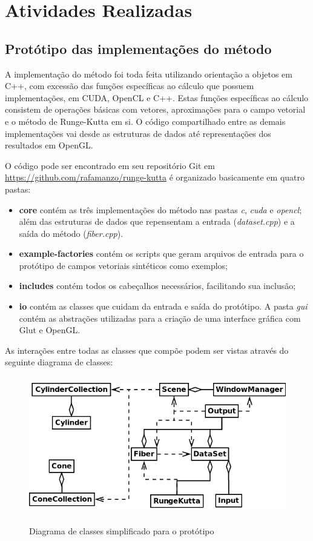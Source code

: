 \chapter{Atividades Realizadas}

\section{Protótipo das implementações do método}
A implementação do método foi toda feita utilizando orientação a objetos em C++, com excessão das funções específicas ao cálculo que possuem implementações, em CUDA, OpenCL e C++. Estas funções específicas ao cálculo consistem de operações básicas com vetores, aproximações para o campo vetorial e o método de Runge-Kutta em si. O código compartilhado entre as demais implementações vai desde as estruturas de dados até representações dos resultados em OpenGL.

O código pode ser encontrado em seu repositório Git em \newline\href{https://github.com/rafamanzo/runge-kutta}{https://github.com/rafamanzo/runge-kutta} é organizado basicamente em quatro pastas:
\begin{itemize}
  \item \textbf{core} contém as três implementações do método nas pastas \textit{c}, \textit{cuda} e \textit{opencl}; além das estruturas de dados que repensentam a entrada (\textit{dataset.cpp}) e a saída do método (\textit{fiber.cpp}).
  \item \textbf{example-factories} contém os scripts que geram arquivos de entrada para o protótipo de campos vetoriais sintéticos como exemplos;
  \item \textbf{includes} contém todos os cabeçalhos necessários, facilitando sua inclusão;
  \item \textbf{io} contém as classes que cuidam da entrada e saída do protótipo. A pasta \textit{gui} contém as abstrações utilizadas para a criação de uma interface gráfica com Glut e OpenGL. 
\end{itemize}

\newpage
As interações entre todas as classes que compõe podem ser vistas através do seguinte diagrama de classes:
\begin{figure}[!h]
  \begin{center}
    \includegraphics[width=120mm, height=60mm]{images/diagramadeclasse.png}
    \label{fig:}
    \caption{Diagrama de classes simplificado para o protótipo}
  \end{center}
\end{figure}

